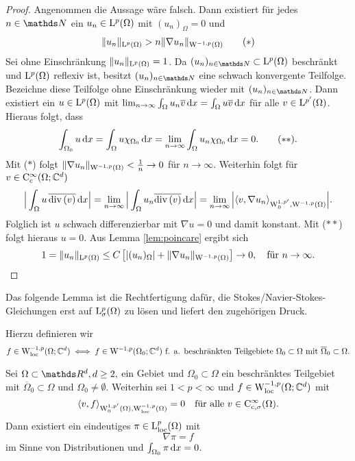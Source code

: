 \begin{proof}
  Angenommen die Aussage wäre falsch.
  Dann existiert für jedes $n \in \N$ ein $u_n \in \mathrm{L}^p(\Omega)$ mit $(u_n)_\Omega = 0$ und
  \begin{align*}
    \|u_n\|_{\mathrm{L}^p(\Omega)} > n \|\nabla u_n \|_{\mathrm{W}^{-1,p}(\Omega)} \tag{$\ast$}
  \end{align*}
  Sei ohne Einschränkung $\|u_n\|_{\mathrm{L}^p(\Omega)} = 1$.
  Da $(u_n)_{n \in \N} \subset \Ell^p(\Omega)$ beschränkt und $\mathrm{L}^p(\Omega)$ reflexiv ist, besitzt $(u_n)_{n \in \N}$ eine schwach konvergente Teilfolge.
  Bezeichne diese Teilfolge ohne Einschränkung wieder mit $(u_n)_{n \in \N}$.
  Dann existiert ein $u \in \mathrm{L}^p(\Omega)$ mit $\lim_{n \to \infty} \int_\Omega u_n \overline v \, {\operatorname{d}\!{x}} = \int_\Omega u \overline v \, {\operatorname{d}\!{x}}$ für alle $v \in \mathrm{L}^{p'}(\Omega)$.
  Hieraus folgt, dass
  \begin{align*}
  \int_{\Omega_0} u \, {\operatorname{d}\!{x}} 
  = \int_\Omega u \chi_{\Omega_0} \, {\operatorname{d}\!{x}}
  = \lim_{n \to \infty} \int_\Omega u_n \chi_{\Omega_0} \, {\operatorname{d}\!{x}} = 0. \tag{$\ast\ast$}.
  \end{align*}
  Mit ($\ast$) folgt $\|\nabla u_n\|_{\mathrm{W}^{-1,p}(\Omega)} < \frac{1}{n} \to 0$ für $n \to \infty$.
  Weiterhin folgt für $v \in \mathrm{C}_{\mathrm{c}}^\infty(\Omega;\mathbb{C}^d)$
  $$
  \Big| \int_\Omega u \, \overline{\mathrm{div\,} (v)} \, {\operatorname{d}\!{x}} \Big|
  = \lim_{n \to \infty} \Big| \int_\Omega u_n \overline{\mathrm{div\,} (v)} \, {\operatorname{d}\!{x}} \Big|
  = \lim_{n \to \infty} \Big| \langle v, \nabla u_n \rangle_{\mathrm{W}_0^{1,p'}, \mathrm{W}^{-1,p}(\Omega)} \Big|.
  $$
  Folglich ist $u$ schwach differenzierbar mit $\nabla u = 0$ und damit konstant.
  Mit ($\ast\ast$) folgt hieraus $u = 0$.
  Aus Lemma \ref{lem:poincare} ergibt sich
  \[
  1 = \|u_n\|_{\mathrm{L}^p(\Omega)}
  \leq C \left[ |(u_n)_\Omega| + \|\nabla u_n\|_{\mathrm{W}^{-1,p}(\Omega)} \right] \to 0, \quad\text{für } n \to \infty. \qedhere
  \]
\end{proof}

Das folgende Lemma ist die Rechtfertigung dafür, die Stokes/Navier-Stokes-Gleichungen erst auf $\mathrm{L}_\sigma^p(\Omega)$ zu lösen und liefert den zugehörigen Druck.

Hierzu definieren wir
$$
f \in \mathrm{W}_{\operatorname{loc}}^{-1,p}(\Omega; \mathbb{C}^d) \iff f \in \mathrm{W}^{-1,p}(\Omega_0; \mathbb{C}^d) \text{ f. a. beschränkten Teilgebiete } \Omega_0 \subset \Omega \text{ mit } \overline\Omega_0 \subset \Omega.
$$

\begin{lem}
  \label{lem:pressureGrad}
  Sei $\Omega \subset \R^d, d \geq 2,$ ein Gebiet und $\Omega_0 \subset \Omega$ ein beschränktes Teilgebiet mit $\overline\Omega_0 \subset \Omega$ und $\Omega_0 \neq \emptyset$.
  Weiterhin sei $1 < p < \infty$ und $f \in \mathrm{W}_{\operatorname{loc}}^{-1,p}(\Omega; \mathbb{C}^d)$ mit
  $$
  \langle v , f \rangle_{\mathrm{W}_0^{1,p'}(\Omega), \mathrm{W}_{\operatorname{loc}}^{-1,p}(\Omega)} = 0 \quad\text{für alle } v \in \mathrm{C}_{\mathrm{c},\sigma}^\infty(\Omega).
  $$
  Dann existiert ein eindeutiges $\pi \in \mathrm{L}^p_{\operatorname{loc}}(\Omega)$ mit
  $$
  \nabla \pi = f
  $$
  im Sinne von Distributionen und $\int_{\Omega_0} \pi \, {\operatorname{d}\!{x}} = 0$.
\end{lem}

